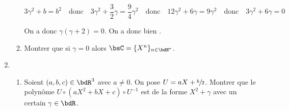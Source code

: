 \documentclass[a4paper,french,bookmarks]{article}
\begin{document}
\begin{enumerate}
\begin{enumerate}
{            \[ 3\gamma^2 + b = b^2 \quad \text{donc} \quad 3\gamma^2 + \frac{3}{2}\gamma = \frac{9}{4}\gamma^2 \quad \text{donc} \quad 12\gamma^2 + 6\gamma = 9\gamma^2 \quad \text{donc} \quad 3\gamma^2 + 6\gamma = 0\]
            
            On a donc $\gamma(\gamma + 2) = 0$. On a donc bien .
            
        }
        
        \item\label{question2:6:d} Montrer que si $\gamma = 0$ alors $\bsC = \{X^n\}_{n \in \bdN^*}$.
        
    \end{enumerate}
    
    \item \begin{enumerate}
        \item\label{question2:7:a} Soient $(a, b, c) \in \bdR^3$ avec $a \neq 0$. On pose $U = aX + \sfrac{b}{2}$. Montrer que le polynôme $U \circ (aX^2 + bX + c) \circ U^{-1}$ est de la forme $X^2 + \gamma$ avec un certain $\gamma \in \bdR$.
        

\end{enumerate}
\end{enumerate}
\end{document}
